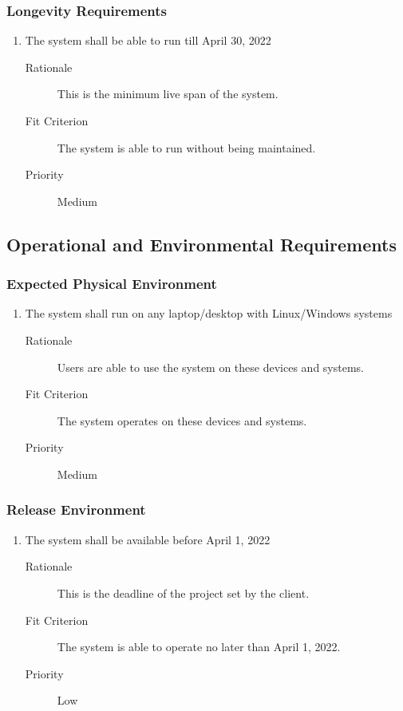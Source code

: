 \documentclass[12pt, titlepage]{article}
\begin{document}
\subsubsection{Longevity Requirements}
\begin{enumerate}[resume*=NFR]
\item The system shall be able to run till April 30, 2022
  \begin{description}
  \item[Rationale] This is the minimum live span of the system.
  \item[Fit Criterion] The system is able to run without being maintained.
  \item[Priority] Medium
  \end{description}

\end{enumerate}

\subsection{Operational and Environmental Requirements}
\subsubsection{Expected Physical Environment}
\begin{enumerate}[resume*=NFR]
\item The system shall run on any laptop/desktop with Linux/Windows systems
  \begin{description}
  \item[Rationale] Users are able to use the system on these devices and systems.
  \item[Fit Criterion] The system operates on these devices and systems.
  \item[Priority] Medium
  \end{description}

\end{enumerate}

\subsubsection{Release Environment}
\begin{enumerate}[resume*=NFR]
\item The system shall be available before April 1, 2022
  \begin{description}
  \item[Rationale] This is the deadline of the project set by the client.
  \item[Fit Criterion] The system is able to operate no later than April 1, 2022.
  \item[Priority] Low
  \end{description}

\end{enumerate}
\end{document}
